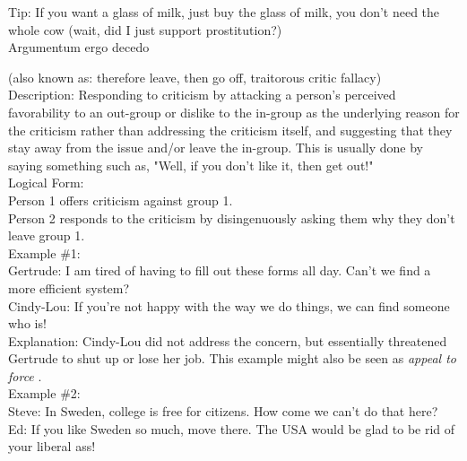 \documentclass[a4paper,12pt,single,pdftex]{scrartcl}
\begin{document}
    
      Tip: If you want a glass of milk, just buy the glass of milk, you don't need the whole cow (wait, did I just support prostitution?)
    \\

  

Argumentum ergo decedo
    
      (also known as: therefore leave, then go off, traitorous critic fallacy)
    \\

  
    
      Description: Responding to criticism by attacking a person's perceived favorability to an out-group or dislike to the in-group as the underlying reason for the criticism rather than addressing the criticism itself, and suggesting that they stay away from the issue and/or leave the in-group. This is usually done by saying something such as, "Well, if you don't like it, then get out!"
    \\

    
      Logical Form:
    \\

    
      Person 1 offers criticism against group 1.
    \\

    
      Person 2 responds to the criticism by disingenuously asking them why they don't leave group 1.
    \\

    
      Example \#1:
    \\

    
      Gertrude: I am tired of having to fill out these forms all day. Can't we find a more efficient system?
    \\

    
      Cindy-Lou: If you're not happy with the way we do things, we can find someone who is!
    \\

    
      Explanation: Cindy-Lou did not address the concern, but essentially threatened Gertrude to shut up or lose her job. This example might also be seen as {\it appeal to force} .
    \\

    
      Example \#2:
    \\

    
      Steve: In Sweden, college is free for citizens. How come we can't do that here?
    \\

    
      Ed: If you like Sweden so much, move there. The USA would be glad to be rid of your liberal ass!
    \\
\end{document}
